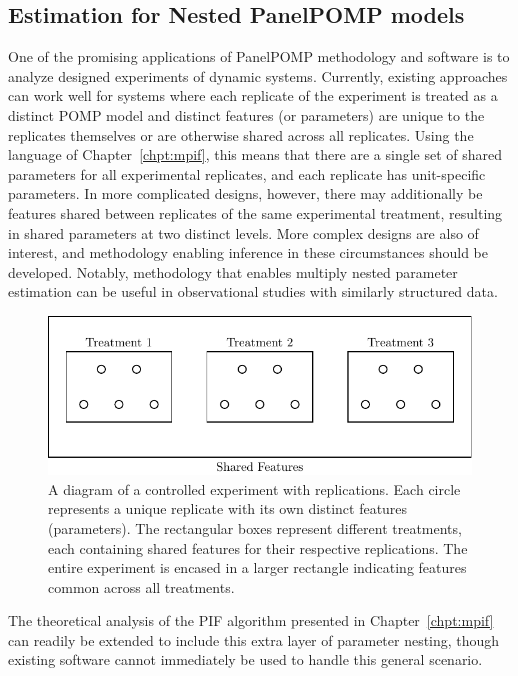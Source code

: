 \subsection*{Estimation for Nested PanelPOMP models}

One of the promising applications of PanelPOMP methodology and software is to analyze designed experiments of dynamic systems.
Currently, existing approaches can work well for systems where each replicate of the experiment is treated as a distinct POMP model and distinct features (or parameters) are unique to the replicates themselves or are otherwise shared across all replicates.
Using the language of Chapter~\ref{chpt:mpif}, this means that there are a single set of shared parameters for all experimental replicates, and each replicate has unit-specific parameters. 
In more complicated designs, however, there may additionally be features shared between replicates of the same experimental treatment, resulting in shared parameters at two distinct levels.
More complex designs are also of interest, and methodology enabling inference in these circumstances should be developed.
Notably, methodology that enables multiply nested parameter estimation can be useful in observational studies with similarly structured data. 

\begin{figure}[h!]
    \centering
    \includegraphics[width=0.7\linewidth]{chapters/conclusion/nestedDesign.pdf}
    \caption[A diagram of a controlled experiment with replications.]{A diagram of a controlled experiment with replications. Each circle represents a unique replicate with its own distinct features (parameters). The rectangular boxes represent different treatments, each containing shared features for their respective replications. The entire experiment is encased in a larger rectangle indicating features common across all treatments.}
    \label{fig:controlled_experiment}
\end{figure}

The theoretical analysis of the PIF algorithm presented in Chapter~\ref{chpt:mpif} can readily be extended to include this extra layer of parameter nesting, though existing software cannot immediately be used to handle this general scenario.

